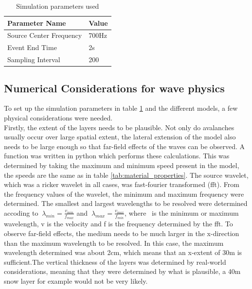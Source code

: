 \documentclass[a4paper,10pt]{article}
\begin{document}
\begin{table}[H]
\centering
\caption{Simulation parameters used}
\label{tab:simulation_params}
\begin{tabular}{|l|l|}
\hline
Parameter Name          & Value \\ \hline
Source Center Frequency & 700Hz \\ \hline
Event End Time          & 2s    \\ \hline
Sampling Interval       & 200   \\ \hline
\end{tabular}
\end{table}


\subsection{Numerical Considerations for wave physics}
\noindent To set up the simulation parameters in table \ref{tab:simulation_params} and the different models, a few physical considerations were needed. \\

\noindent Firstly, the extent of the layers needs to be plausible. Not only do avalanches usually occur over large spatial extent, the lateral extension of the model also needs to be large enough so that far-field effects of the waves can be observed. A function was written in python which performs these calculations.  This was determined by taking the maximum and minimum speed present in the model, the speeds are the same as in table \ref{tab:material_properties}. The source wavelet, which was a ricker wavelet in all cases, was fast-fourier transformed (fft). From the frequency values of the wavelet, the minimum and maximum frequency were determined. The smallest and largest wavelengths to be resolved were determined accoding to $\ \lambda_{min} = \frac{v_{min}}{f_{max}}$ and $\ \lambda_{max} = \frac{v_{max}}{f_{min}}$, where \lambda \ is the minimum or maximum wavelength, v is the velocity and f is the frequency determined by the fft. To observe far-field effects, the medium needs to be much larger in the x-direction than the maximum wavelength to be resolved. In this case, the maximum wavelength determined was about 2cm, which means that an x-extent of 30m is sufficient.The vertical thickness of the layers was determined by real-world considerations, meaning that they were determined by what is plausible, a 40m snow layer for example would not be very likely. \\
\end{document}
